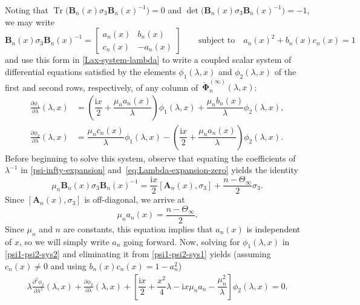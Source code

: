 \documentclass[pdftex]{sigma}
\numberwithin{equation}{section}
\newcommand{\ii}{\mathrm{i}}
\newcommand{\para}[1]{\breve{#1}}
\newcommand{\Tr}{\operatorname{Tr}}
\begin{document}
Noting that $\Tr\big(\mathbf{B}_{n}(x)\sigma_3\mathbf{B}_{n}(x)^{-1}\big)=0$ and $\det \big(\mathbf{B}_{n}(x) \sigma_3 \mathbf{B}_{n}(x)^{-1}\big) = -1$, we may write
\begin{equation}
\mathbf{B}_{n}(x) \sigma_3 \mathbf{B}_{n}(x)^{-1} = \begin{bmatrix} a_n(x) & b_n(x) \\ c_n(x) & -a_n(x) \end{bmatrix} \qquad \text{subject to}\quad a_n(x)^2 + b_n(x)c_n(x) = 1
\label{eq:zero-coefficient-matrix}
\end{equation}
and use this form in \eqref{Lax-system-lambda} to write a coupled scalar system of differential equations satisfied by the elements $\phi_1(\lambda,x)$ and $\phi_2(\lambda,x)$ of the first and second rows, respectively, of any column of~$\para{\boldsymbol \Phi}_n^{(\infty)}(\lambda,x)$:
\begin{align}
\label{psi1-psi2-sys1} \frac{\partial\phi_{1}}{\partial\lambda}(\lambda,x) &= \left(\dfrac{\ii x}{2} + \dfrac{\mu_n a_n(x)}{\lambda}\right) \phi_1(\lambda,x) + \dfrac{\mu_n b_n(x)}{\lambda} \phi_2(\lambda,x), \\
\label{psi1-psi2-sys2} \frac{\partial\phi_{2}}{\partial\lambda}(\lambda,x) &= \dfrac{\mu_n c_n(x)}{\lambda} \phi_1(\lambda,x)-\left(\dfrac{\ii x}{2}+ \dfrac{\mu_n a_n(x)}{\lambda}\right) \phi_2(\lambda,x).
\end{align}
Before beginning to solve this system, observe that equating the coefficients of $\lambda^{-1}$ in \eqref{psi-infty-expansion} and~\eqref{eq:Lambda-expansion-zero} yields the identity
\begin{equation}
\label{C-A relation}
\mu_n \mathbf{B}_{n}(x) \sigma_3 \mathbf{B}_{n}(x)^{-1} = \dfrac{\ii x}{2} [\mathbf{A}_{n}(x), \sigma_3] + \dfrac{n - \Theta_\infty}{2} \sigma_3.
\end{equation}
Since $[\mathbf{A}_{n}(x), \sigma_3]$ is off-diagonal, we arrive at
\begin{equation}
\mu_n a_n(x) = \frac{n - \Theta_\infty}{2}.
\label{eq:little-an}
\end{equation}
Since $\mu_n$ and $n$ are constants, this equation implies that $a_n(x)$ is independent of $x$, so we will simply write $a_n$ going forward.
Now, solving for $\phi_1(\lambda,x)$ in \eqref{psi1-psi2-sys2} and eliminating it from \eqref{psi1-psi2-sys1} yields (assuming $c_n(x) \neq 0$ and using $b_n(x)c_n(x) = 1 - a_n^2$)
\begin{align*}
 \lambda \frac{\partial^2\phi_{2}}{\partial\lambda^2}(\lambda,x) + \frac{\partial\phi_{2}}{\partial\lambda}(\lambda,x) + \left[ \dfrac{\ii x}{2} + \dfrac{x^2}{4} \lambda - \ii x\mu_n a_n - \dfrac{\mu_n^2}{\lambda} \right]\phi_2(\lambda,x) = 0.
\end{align*}
\end{document}
